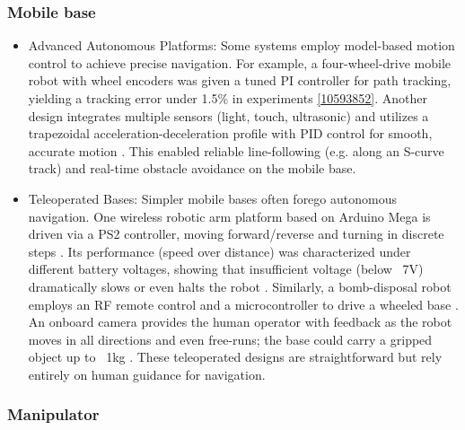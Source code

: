 \documentclass{article}
\begin{document}
\subsubsection{Mobile base}

\begin{itemize}
  
  \item Advanced Autonomous Platforms: Some systems employ model-based motion control to achieve precise navigation. For example, a four-wheel-drive mobile robot with wheel encoders was given a tuned PI controller for path tracking, yielding a tracking error under 1.5\% in experiments \ref{10593852}. Another design integrates multiple sensors (light, touch, ultrasonic) and utilizes a trapezoidal acceleration-deceleration profile with PID control for smooth, accurate motion \cite{7475009}. This enabled reliable line-following (e.g. along an S-curve track) and real-time obstacle avoidance on the mobile base.
  \item Teleoperated Bases: Simpler mobile bases often forego autonomous navigation. One wireless robotic arm platform based on Arduino Mega is driven via a PS2 controller, moving forward/reverse and turning in discrete steps \cite{YUSOFF20121072}. Its performance (speed over distance) was characterized under different battery voltages, showing that insufficient voltage (below ~7V) dramatically slows or even halts the robot \cite{YUSOFF20121072}. Similarly, a bomb-disposal robot employs an RF remote control and a microcontroller to drive a wheeled base \cite{6805994}. An onboard camera provides the human operator with feedback as the robot moves in all directions and even free-runs; the base could carry a gripped object up to ~1kg \cite{6805994}. These teleoperated designs are straightforward but rely entirely on human guidance for navigation.

\end{itemize}

\subsubsection{Manipulator}
\end{document}
